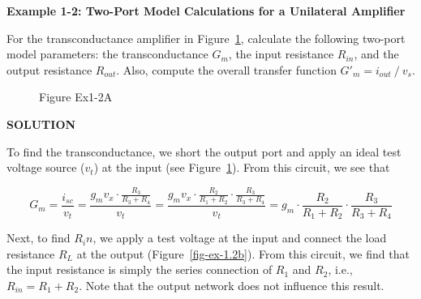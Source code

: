 \documentclass[
  11pt,
  letterpaper,
  abstract]{scrbook}
\begin{document}
\textbf{Example 1-2: Two-Port Model Calculations for a Unilateral
Amplifier}

For the transconductance amplifier in Figure~\ref{fig-ex-1.2a},
calculate the following two-port model parameters: the transconductance
\(G_m\), the input resistance \(R_{in}\), and the output resistance
\(R_{out}\). Also, compute the overall transfer function
\(G'_m = i_{out} ⁄ v_s\).

\begin{figure}


\caption{\label{fig-ex-1.2a}Figure Ex1-2A}

\end{figure}%

\textbf{SOLUTION}

To find the transconductance, we short the output port and apply an
ideal test voltage source (\(v_t\)) at the input (see
Figure~\ref{fig-ex-1.2a}). From this circuit, we see that

\[
G_m = \frac{i_{sc}}{v_t} = \frac{g_m v_x \cdot \frac{R_3}{R_3 + R_4}}{v_t} = \frac{g_m v_x \cdot \frac{R_2}{R_1 + R_2} \cdot \frac{R_3}{R_3 + R_4}}{v_t} = g_m \cdot \frac{R_2}{R_1 + R_2} \cdot \frac{R_3}{R_3 + R_4}
\]

Next, to find \(R_in\), we apply a test voltage at the input and connect
the load resistance \(R_L\) at the output (Figure~\ref{fig-ex-1.2b}).
From this circuit, we find that the input resistance is simply the
series connection of \(R_1\) and \(R_2\), i.e., \(R_{in} = R_1 + R_2\).
Note that the output network does not influence this result.
\end{document}
